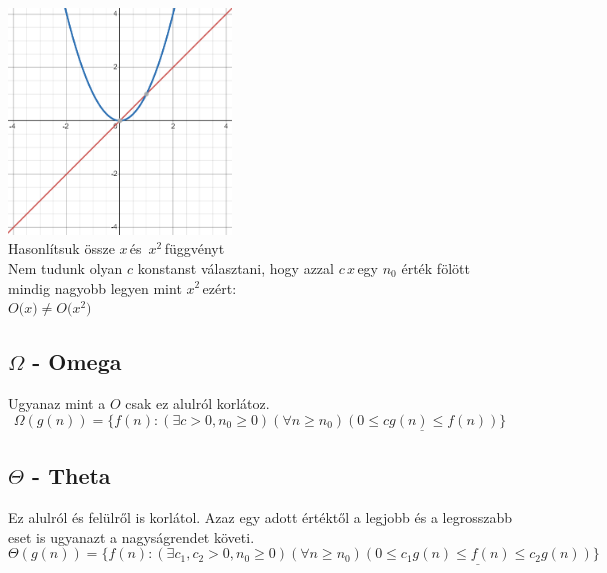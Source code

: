 \documentclass{article}
\theoremstyle{mytheoremstyle}
\theoremstyle{mytheoremstyle}
\theoremstyle{myproblemstyle}
\begin{document}
\begin{center}
    \includegraphics[height=6cm]{o2}\\
    Hasonlítsuk össze \color{red}$x$\color{black}\,és\,
    \color{blue}$x^2$\color{black}\,függvényt\\
    Nem tudunk olyan $c$ konstanst választani, hogy azzal
    $c$\,\color{red}$x$\color{black}\,egy
    $n_0$ érték fölött mindig nagyobb legyen mint
    \color{blue}$x^2$\color{black}\,ezért:\\
    $O($\color{red}$x$\color{black}$)\neq O($\color{blue}$x^2$\color{black}$)$
\end{center}

\subsection{$\Omega$ - Omega}
Ugyanaz mint a $O$ csak ez alulról korlátoz.
\[\Omega(g(n))=\{f(n):(\exists c>0,n_0\geq 0)(\forall n\geq n_0)
    \underline{(0\leq cg(n)\leq f(n))}
    \}\]

\subsection{$\Theta$ - Theta}
Ez alulról és felülről is korlátol. Azaz egy adott értéktől
a legjobb és a legrosszabb eset is ugyanazt a nagyságrendet követi.
\[\Theta(g(n))=\{f(n):(\exists c_1,c_2>0,n_0\geq 0)(\forall n\geq n_0)
    \underline{(0\leq c_1g(n)\leq f(n)\leq c_2g(n))}
    \}\]
\end{document}
